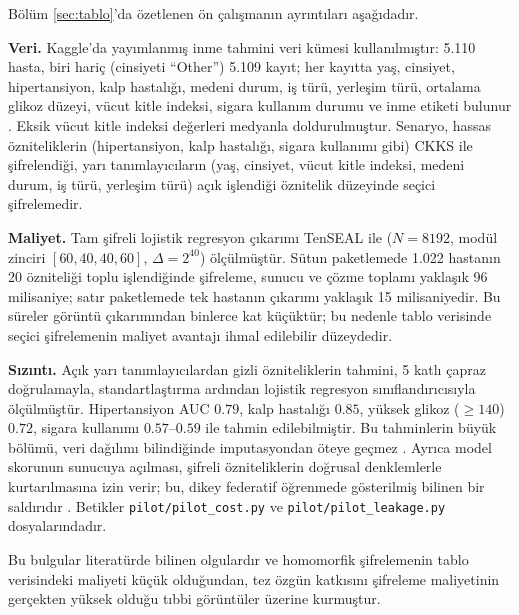Bölüm \ref{sec:tablo}'da özetlenen ön çalışmanın ayrıntıları aşağıdadır.

\textbf{Veri.} Kaggle'da yayımlanmış inme tahmini veri kümesi kullanılmıştır: 5.110 hasta, biri hariç (cinsiyeti ``Other'') 5.109 kayıt; her kayıtta yaş, cinsiyet, hipertansiyon, kalp hastalığı, medeni durum, iş türü, yerleşim türü, ortalama glikoz düzeyi, vücut kitle indeksi, sigara kullanım durumu ve inme etiketi bulunur \cite{kaggle2021stroke}. Eksik vücut kitle indeksi değerleri medyanla doldurulmuştur. Senaryo, hassas özniteliklerin (hipertansiyon, kalp hastalığı, sigara kullanımı gibi) CKKS ile şifrelendiği, yarı tanımlayıcıların (yaş, cinsiyet, vücut kitle indeksi, medeni durum, iş türü, yerleşim türü) açık işlendiği öznitelik düzeyinde seçici şifrelemedir.

\textbf{Maliyet.} Tam şifreli lojistik regresyon çıkarımı TenSEAL ile ($N = 8192$, modül zinciri $[60, 40, 40, 60]$, $\Delta = 2^{40}$) ölçülmüştür. Sütun paketlemede 1.022 hastanın 20 özniteliği toplu işlendiğinde şifreleme, sunucu ve çözme toplamı yaklaşık 96 milisaniye; satır paketlemede tek hastanın çıkarımı yaklaşık 15 milisaniyedir. Bu süreler görüntü çıkarımından binlerce kat küçüktür; bu nedenle tablo verisinde seçici şifrelemenin maliyet avantajı ihmal edilebilir düzeydedir.

\textbf{Sızıntı.} Açık yarı tanımlayıcılardan gizli özniteliklerin tahmini, 5 katlı çapraz doğrulamayla, standartlaştırma ardından lojistik regresyon sınıflandırıcısıyla ölçülmüştür. Hipertansiyon AUC $0.79$, kalp hastalığı $0.85$, yüksek glikoz ($\geq 140$) $0.72$, sigara kullanımı $0.57$--$0.59$ ile tahmin edilebilmiştir. Bu tahminlerin büyük bölümü, veri dağılımı bilindiğinde imputasyondan öteye geçmez \cite{jayaraman2022imputation}. Ayrıca model skorunun sunucuya açılması, şifreli özniteliklerin doğrusal denklemlerle kurtarılmasına izin verir; bu, dikey federatif öğrenmede gösterilmiş bilinen bir saldırıdır \cite{luo2021feature}. Betikler \texttt{pilot/pilot\_cost.py} ve \texttt{pilot/pilot\_leakage.py} dosyalarındadır.

Bu bulgular literatürde bilinen olgulardır ve homomorfik şifrelemenin tablo verisindeki maliyeti küçük olduğundan, tez özgün katkısını şifreleme maliyetinin gerçekten yüksek olduğu tıbbi görüntüler üzerine kurmuştur.
